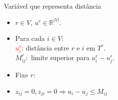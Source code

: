 \documentclass[dvipsnames]{beamer}
\newcommand{\espacoUr}{\mathbb{R}^{|V|}}
\begin{document}
\begin{frame}{Variável que representa distância \hyperlink{sig_u}{}}
  \hypertarget{var_u}{}
  \begin{itemize}
  \item $r \in V$, $u^{r} \in \espacoUr$. \\
  \item Para cada $i \in V:$\\
    \textcolor{red}{$u^{r}_{i}$}: distância entre $r$ e $i$ em $T^{r}$.\\
    $M_{ij}^{r}:$ limite superior para $u^{r}_{i} - u^{r}_{j}$.
  \item Fixe $r:$


{\tiny
  \begin{lpformulation}[]
  \end{lpformulation}    
  
  }

    
     
\item
  $z_{ij} = 0, z_{ji} = 0 \Rightarrow u_i - u_j \le M_{ij}$ 
  
  \end{itemize}

\end{frame}
\end{document}
